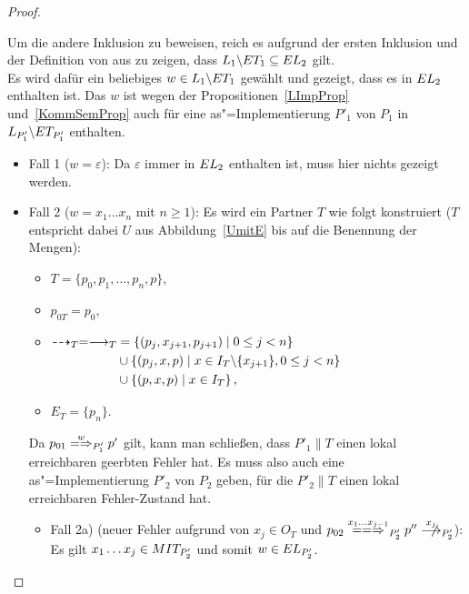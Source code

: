 \begin{proof}
\begin{itemize}
  \end{itemize}
  Um die andere Inklusion zu beweisen, reich es aufgrund der ersten Inklusion
  und der Definition von \EL{} aus zu zeigen, dass $L_1\backslash ET
  _1\subseteq EL _2$ gilt.\\
  Es wird dafür ein beliebiges $w\in L_1\backslash ET _1$ gewählt und gezeigt,
  dass es in $EL _2$ enthalten ist. Das $w$ ist wegen der
  Propositionen~\ref{LImpProp} und~\ref{KommSemProp} auch für eine
  as"=Implementierung $P'_1$ von $P_1$ in $L_{P'_1}\backslash ET _{P'_1}$
  enthalten.
  \begin{itemize}
    \item Fall 1 ($w=\varepsilon$): Da $\varepsilon$ immer in $EL _2$
      enthalten ist, muss hier nichts gezeigt werden.
    \item Fall 2 ($w=x_1\dots x_n$ mit $n\geq 1$): Es wird ein Partner $T$ wie
      folgt konstruiert ($T$ entspricht dabei $U$ aus Abbildung~\ref{UmitE} bis
      auf die Benennung der Mengen):
      \begin{itemize}
        \item $T=\{p_0,p_1,\dots ,p_n,p\}$,
        \item $p_{0T}=p_0$,
        \item $\begin{aligned}[t]
            \may _T = \must _T&=\left\{(p_j,x_{j+1},p_{j+1})\mid 0\leq j<
            n\right\}\\
            &\cup\left\{(p_j,x,p)\mid x\in I_T\backslash\{x_{j+1}\},0\leq j<
            n\right\}\\
            &\cup\left\{(p,x,p)\mid x\in I_T\right\},
        \end{aligned}$
        \item $E_T=\{p_n\}$.
      \end{itemize}
      Da $p_{01} \weakmay[w]_{P'_1} p'$ gilt, kann man schließen, dass
      $P'_1\|T$ einen lokal erreichbaren geerbten Fehler hat. Es muss also auch
      eine as"=Implementierung $P'_2$ von $P_2$ geben, für die $P'_2\|T$ einen
      lokal erreichbaren Fehler-Zustand hat.
      \begin{itemize}
        \item Fall 2a) \big(neuer Fehler aufgrund von $x_j\in O_T$ und $p_{02}
          \lweakmay[x_1\dots x_{j-1}]_{P'_2}p''\hspace{0.25cm} \not
          \hspace{-0.25cm} \must[x_j]_{P'_2}$\big): Es
          gilt $x_1\dots x_j\in MIT _{P'_2}$ und somit $w\in EL _{P'_2}$.

\end{itemize}
\end{itemize}
\end{proof}
